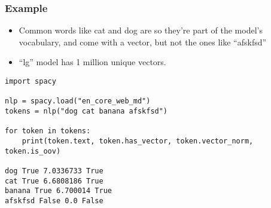 \begin{frame}[fragile]\frametitle{Example}

\begin{itemize}
\item Common words like cat and dog are so they’re part of the model’s vocabulary, and come with a vector, but not the ones like ``afskfsd''
\item ``lg'' model has 1 million unique vectors.
\end{itemize}

\begin{lstlisting}
import spacy

nlp = spacy.load("en_core_web_md")
tokens = nlp("dog cat banana afskfsd")

for token in tokens:
    print(token.text, token.has_vector, token.vector_norm, token.is_oov)
		
dog True 7.0336733 True
cat True 6.6808186 True
banana True 6.700014 True
afskfsd False 0.0 False
\end{lstlisting}


\end{frame}

